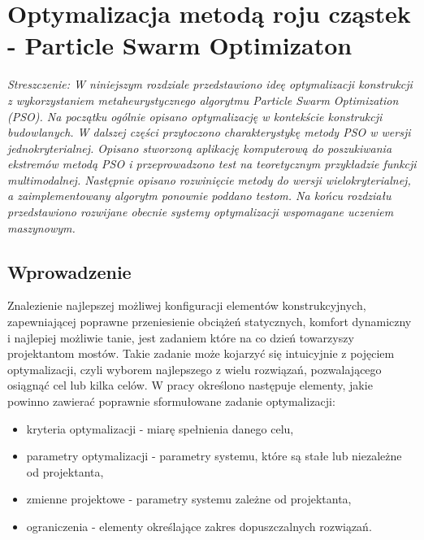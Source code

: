 \chapter{Optymalizacja metodą roju cząstek - Particle Swarm Optimizaton} \label{sect:PSO_chapter}

\textit{Streszczenie: W niniejszym rozdziale przedstawiono ideę optymalizacji konstrukcji z wykorzystaniem metaheurystycznego algorytmu Particle Swarm Optimization (PSO). Na początku ogólnie opisano optymalizację w kontekście konstrukcji budowlanych. W dalszej części przytoczono charakterystykę metody PSO w wersji jednokryterialnej. Opisano stworzoną aplikację komputerową do poszukiwania ekstremów metodą PSO i przeprowadzono test na teoretycznym przykładzie funkcji multimodalnej. Następnie opisano rozwinięcie metody do wersji wielokryterialnej, a zaimplementowany algorytm ponownie poddano testom. Na końcu rozdziału przedstawiono rozwijane obecnie systemy optymalizacji wspomagane uczeniem maszynowym.}

\section*{Wprowadzenie}
Znalezienie najlepszej możliwej konfiguracji elementów konstrukcyjnych, zapewniającej poprawne przeniesienie obciążeń statycznych, komfort dynamiczny i najlepiej możliwie tanie, jest zadaniem które na co dzień towarzyszy projektantom mostów. Takie zadanie może kojarzyć się intuicyjnie z pojęciem optymalizacji, czyli wyborem najlepszego z wielu rozwiązań, pozwalającego osiągnąć cel lub kilka celów. W pracy \cite{Szymczak1995} określono następuje elementy, jakie powinno zawierać poprawnie sformułowane zadanie optymalizacji:
\begin{itemize}
	\item kryteria optymalizacji - miarę spełnienia danego celu,
	\item parametry optymalizacji - parametry systemu, które są stałe lub niezależne od projektanta, 
	\item zmienne projektowe - parametry systemu zależne od projektanta,
	\item ograniczenia - elementy określające zakres dopuszczalnych rozwiązań. 
\end{itemize}

